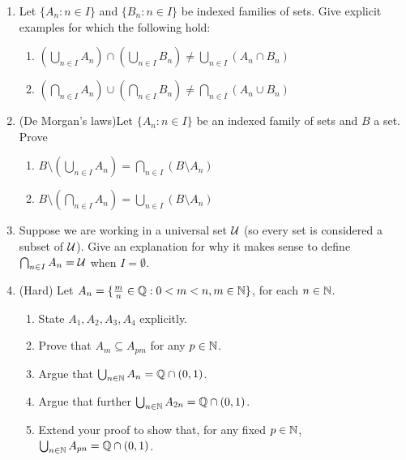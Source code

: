 \begin{exercises}{}{}
\begin{enumerate}
		
		\item Let $\{A_n:n\in I\}$ and $\{B_n:n\in I\}$ be indexed families of sets. Give explicit examples for which the following hold:
		\begin{enumerate}
	    \item $\left(\bigcup_{n\in I} A_n\right) \cap \left(\bigcup_{n\in I}B_n\right) \neq \bigcup_{n\in I} (A_n \cap B_n)$
	    \item $\left(\bigcap_{n\in I} A_n\right) 
	    \cup \left(\bigcap_{n\in I}B_n\right) 
	    \neq \bigcap_{n\in I} (A_n \cup B_n)$
		\end{enumerate}
	
		
		\item (De Morgan's laws)\lstsp Let $\{A_n:n\in I\}$ be an indexed family of sets and $B$ a set. Prove
		\begin{enumerate}
	    \item $B\setminus \left(\bigcup_{n\in I} A_n\right)
	    = \bigcap_{n\in I} (B\setminus A_n)$
	    \item $B\setminus \left(\bigcap_{n\in I} A_n\right)
	    = \bigcup_{n\in I}(B\setminus A_n)$
		\end{enumerate}
		
		
		\item Suppose we are working in a universal set $\mathcal{U}$ (so every set is considered a subset of $\mathcal{U}$). Give an explanation for why it makes sense to define $\bigcap_{n \in I} A_n = \mathcal{U}$ when $I = \emptyset$.
		
		\goodbreak
		
		\item (Hard) Let $A_n=\{\frac mn\in\mathbb{Q}:0<m<n, m\in \mathbb{N}\}$, for each $n\in\mathbb{N}$.
		\begin{enumerate}\itemsep1pt
			\item State $A_1,A_2,A_3,A_4$ explicitly.
			\item Prove that $A_m\subseteq A_{pm}$ for any $p\in\mathbb{N}$.
			\item Argue that $\bigcup_{n\in\mathbb{N}}A_n=\mathbb{Q}\cap (0,1)$.
			\item Argue that further $\bigcup_{n\in\mathbb{N}}A_{2n}=\mathbb{Q}\cap (0,1)$.
			\item Extend your proof to show that, for any fixed $p\in\mathbb{N}$, $\bigcup_{n\in\mathbb{N}}A_{pn}=\mathbb{Q}\cap (0,1)$.
		\end{enumerate}
		
		\goodbreak
		

\end{enumerate}
\end{exercises}
